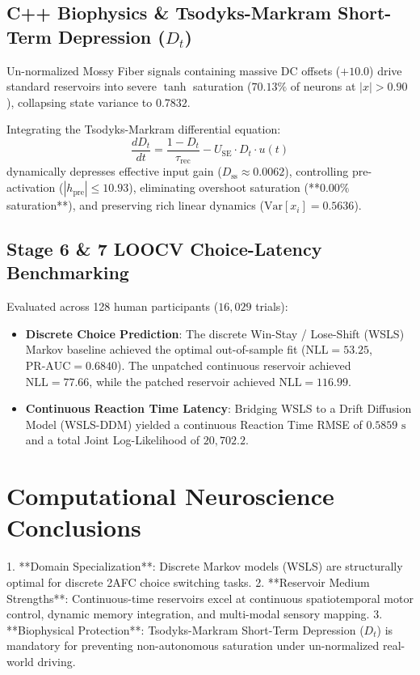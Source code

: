 \documentclass[11pt,a4paper]{article}
\begin{document}
\subsection{C++ Biophysics \& Tsodyks-Markram Short-Term Depression ($D_t$)}
Un-normalized Mossy Fiber signals containing massive DC offsets ($+10.0$) drive standard reservoirs into severe $\tanh$ saturation ($70.13\%$ of neurons at $|x| > 0.90$), collapsing state variance to $0.7832$. 

Integrating the Tsodyks-Markram differential equation:
\begin{equation}
\frac{dD_t}{dt} = \frac{1 - D_t}{\tau_{\text{rec}}} - U_{\text{SE}} \cdot D_t \cdot u(t)
\end{equation}
dynamically depresses effective input gain ($D_{\text{ss}} \approx 0.0062$), controlling pre-activation ($|h_{\text{pre}}| \le 10.93$), eliminating overshoot saturation (**$0.00\%$ saturation**), and preserving rich linear dynamics ($\text{Var}[x_i] = 0.5636$).

\subsection{Stage 6 \& 7 LOOCV Choice-Latency Benchmarking}
Evaluated across 128 human participants ($16,029$ trials):
\begin{itemize}
    \item \textbf{Discrete Choice Prediction}: The discrete Win-Stay / Lose-Shift (WSLS) Markov baseline achieved the optimal out-of-sample fit ($\text{NLL} = 53.25$, $\text{PR-AUC} = 0.6840$). The unpatched continuous reservoir achieved $\text{NLL} = 77.66$, while the patched reservoir achieved $\text{NLL} = 116.99$.
    \item \textbf{Continuous Reaction Time Latency}: Bridging WSLS to a Drift Diffusion Model (WSLS-DDM) yielded a continuous Reaction Time RMSE of $0.5859\text{ s}$ and a total Joint Log-Likelihood of $20,702.2$.
\end{itemize}

\section{Computational Neuroscience Conclusions}
1. **Domain Specialization**: Discrete Markov models (WSLS) are structurally optimal for discrete 2AFC choice switching tasks.
2. **Reservoir Medium Strengths**: Continuous-time reservoirs excel at continuous spatiotemporal motor control, dynamic memory integration, and multi-modal sensory mapping.
3. **Biophysical Protection**: Tsodyks-Markram Short-Term Depression ($D_t$) is mandatory for preventing non-autonomous saturation under un-normalized real-world driving.
\end{document}
